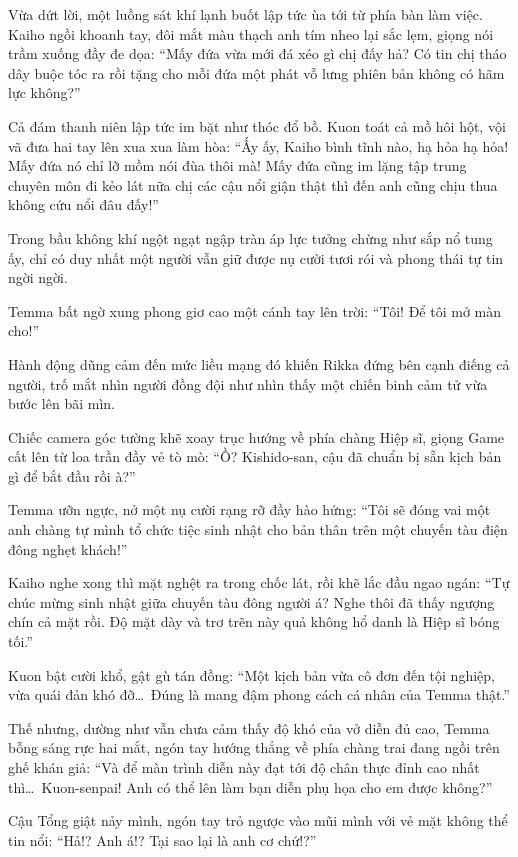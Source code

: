 \documentclass[../main.tex]{subfiles}
\begin{document}
Vừa dứt lời, một luồng sát khí lạnh buốt lập tức ùa tới từ phía bàn làm việc. Kaiho ngồi khoanh tay, đôi mắt màu thạch anh tím nheo lại sắc lẹm, giọng nói trầm xuống đầy đe dọa: ``Mấy đứa vừa mới đá xéo gì chị đấy hả? Có tin chị tháo dây buộc tóc ra rồi tặng cho mỗi đứa một phát vỗ lưng phiên bản không có hãm lực không?''

Cả đám thanh niên lập tức im bặt như thóc đổ bồ. Kuon toát cả mồ hôi hột, vội vã đưa hai tay lên xua xua làm hòa: ``Ấy ấy, Kaiho bình tĩnh nào, hạ hỏa hạ hỏa! Mấy đứa nó chỉ lỡ mồm nói đùa thôi mà! Mấy đứa cũng im lặng tập trung chuyên môn đi kẻo lát nữa chị các cậu nổi giận thật thì đến anh cũng chịu thua không cứu nổi đâu đấy!''

Trong bầu không khí ngột ngạt ngập tràn áp lực tưởng chừng như sắp nổ tung ấy, chỉ có duy nhất một người vẫn giữ được nụ cười tươi rói và phong thái tự tin ngời ngời.

Temma bất ngờ xung phong giơ cao một cánh tay lên trời: ``Tôi! Để tôi mở màn cho!''

Hành động dũng cảm đến mức liều mạng đó khiến Rikka đứng bên cạnh điếng cả người, trố mắt nhìn người đồng đội như nhìn thấy một chiến binh cảm tử vừa bước lên bãi mìn.

Chiếc camera góc tường khẽ xoay trục hướng về phía chàng Hiệp sĩ, giọng Game cất lên từ loa trần đầy vẻ tò mò: ``Ồ? Kishido-san, cậu đã chuẩn bị sẵn kịch bản gì để bắt đầu rồi à?''

Temma ưỡn ngực, nở một nụ cười rạng rỡ đầy hào hứng: ``Tôi sẽ đóng vai một anh chàng tự mình tổ chức tiệc sinh nhật cho bản thân trên một chuyến tàu điện đông nghẹt khách!''

Kaiho nghe xong thì mặt nghệt ra trong chốc lát, rồi khẽ lắc đầu ngao ngán: ``Tự chúc mừng sinh nhật giữa chuyến tàu đông người á? Nghe thôi đã thấy ngượng chín cả mặt rồi. Độ mặt dày và trơ trẽn này quả không hổ danh là Hiệp sĩ bóng tối.''

Kuon bật cười khổ, gật gù tán đồng: ``Một kịch bản vừa cô đơn đến tội nghiệp, vừa quái đản khó đỡ\dots\ Đúng là mang đậm phong cách cá nhân của Temma thật.''

Thế nhưng, dường như vẫn chưa cảm thấy độ khó của vở diễn đủ cao, Temma bỗng sáng rực hai mắt, ngón tay hướng thẳng về phía chàng trai đang ngồi trên ghế khán giả: ``Và để màn trình diễn này đạt tới độ chân thực đỉnh cao nhất thì\dots\ Kuon-senpai! Anh có thể lên làm bạn diễn phụ họa cho em được không?''

Cậu Tổng giật nảy mình, ngón tay trỏ ngược vào mũi mình với vẻ mặt không thể tin nổi: ``Hả!? Anh á!? Tại sao lại là anh cơ chứ!?''
\end{document}
